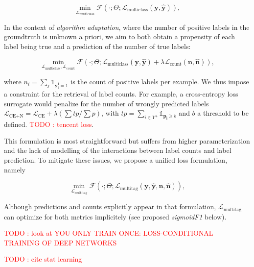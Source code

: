 \documentclass[sigconf,natbib,screen=true,review=true,anonymous]{acmart}
\newcommand\todo[1]{\textcolor{red}{TODO : #1}}
\begin{document}
\begin{equation}
\underset{\mathcal{L}_{\text {multiclass}}} {\min} \mathcal{F}\left(\cdot ; \Theta; \mathcal{L}_{\text {multiclass}} (\mathbf{y}, \hat{\mathbf{y}}) \right),
\end{equation}

In the context of \emph{algorithm adaptation}, where the number of positive labels in the groundtruth is unknown a priori, we aim to both obtain a propensity of each label being true and a prediction of the number of true labels: 

\begin{equation}
\underset{\mathcal{L}_{\text {multiclass}}, \mathcal{L}_{\text {count}}} {\min} \mathcal{F}\left(\cdot ; \Theta; \mathcal{L}_{\text {multiclass}} (\mathbf{y}, \hat{\mathbf{y}}) + \lambda \mathcal{L}_{\text {count}} (\mathbf{n}, \hat{\mathbf{n}})\right),
\end{equation}

where \(n_i = \sum_j \mathds{1}_{\mathbf{y_i^j} = 1}\) is the count of positive labels per example. We thus impose a constraint for the retrieval of label counts. For example, a cross-entropy loss surrogate would penalize for the number of wrongly predicted labels \(\mathcal{L}_{\text {CE+N}}= \mathcal{L}_{\text {CE}} + \lambda (\sum tp / \sum p)\), with \(t p=\sum_{i \in Y^{+}} \mathds{1}_{\mathbf{p_i} \geq b}\) and \(b\) a threshold to be defined. \todo{tencent loss}.

This formulation is most straightforward but suffers from higher parameterization and the lack of modelling of the interactions between label counts and label prediction. To mitigate these issues, we propose a unified loss formulation, namely

\begin{equation}
\underset{\mathcal{L}_{\text {multitag}}} {\min} \mathcal{F}\left(\cdot ; \Theta; \mathcal{L}_{\text {multitag}} (\mathbf{y}, \hat{\mathbf{y}}, \mathbf{n}, \hat{\mathbf{n}}) \right),
\end{equation}

Although predictions and counts explicitly appear in that formulation, \(\mathcal{L}_{\text {multitag}}\) can optimize for both metrics implicitely (see proposed \emph{sigmoidF1} below).


\todo{look at YOU ONLY TRAIN ONCE: LOSS-CONDITIONAL TRAINING OF DEEP NETWORKS}

\todo{cite stat learning}   \cite[p. 308-310]{statLearning}


\end{document}
